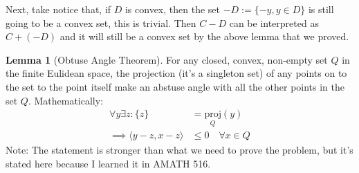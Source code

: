 \documentclass[]{article}
\theoremstyle{definition}
\newtheorem{lemma}{Lemma}
\begin{document}
    Next, take notice that, if $D$ is convex, then the set $-D := \{-y, y \in D\}$ is still going to be a convex set, this is trivial. Then $C-D$ can be interpreted as $C + (-D)$ and it will still be a convex set by the above lemma that we proved. 
    \begin{lemma}[Obtuse Angle Theorem]
        For any closed, convex, non-empty set $Q$ in the finite Eulidean space, the projection (it's a singleton set) of any points on to the set to the point itself make an abstuse angle with all the other points in the set $Q$. Mathematically: 
        \begin{align}
            \forall y \exists z: \{z\} &= \underset{Q}{\text{proj}}(y)
            \\
            \implies
            \langle y - z, x - z\rangle &\le 0 \quad \forall x \in Q
        \end{align}
        Note: The statement is stronger than what we need to prove the problem, but it's stated here because I learned it in AMATH 516. 
    \end{lemma}
\end{document}
